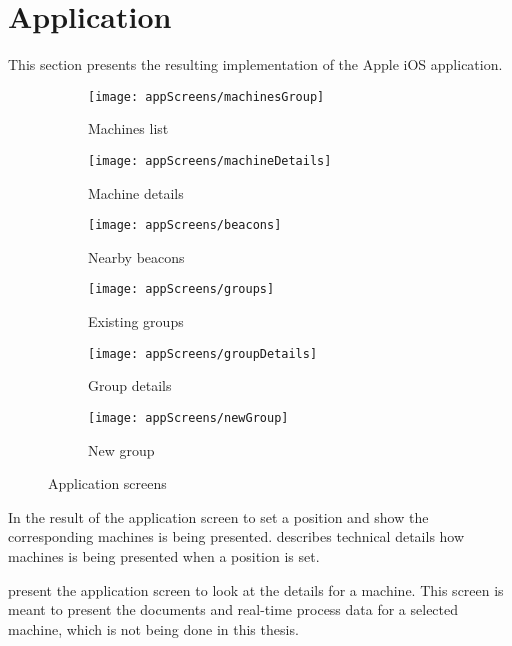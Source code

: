 \section{Application}\label{sec:resultApp}
This section presents the resulting implementation of the Apple iOS application.

\begin{figure}[H]
	\centering
	\begin{subfigure}[t]{0.3\textwidth}
		\centering	
		\texttt{[image: appScreens/machinesGroup]}
		\caption{Machines list}
		\label{subfig:machinesList}
	\end{subfigure}%
	\begin{subfigure}[t]{0.3\textwidth}
		\centering	
		\texttt{[image: appScreens/machineDetails]}
		\caption{Machine details}
		\label{subfig:machineDetails}
	\end{subfigure}
	\begin{subfigure}[t]{0.3\textwidth}
		\centering	
		\texttt{[image: appScreens/beacons]}
		\caption{Nearby beacons}
		\label{subfig:nearbyBeacons}
	\end{subfigure}
	\begin{subfigure}[t]{0.3\textwidth}
		\centering	
		\texttt{[image: appScreens/groups]}
		\caption{Existing groups}
		\label{subfig:existingGroups}
	\end{subfigure}
	\begin{subfigure}[t]{0.3\textwidth}
		\centering	
		\texttt{[image: appScreens/groupDetails]}
		\caption{Group details}
		\label{subfig:groupDetails}
	\end{subfigure}
	\begin{subfigure}[t]{0.3\textwidth}
		\centering	
		\texttt{[image: appScreens/newGroup]}
		\caption{New group}
		\label{subfig:newGroup}
	\end{subfigure}

	\caption{Application screens}
	\label{fig:appScreens}

\end{figure}

In  the result of the application screen to set a position and show the corresponding machines is being presented.
 describes technical details how machines is being presented when a position is set.

\bigskip

 present the application screen to look at the details for a machine.
This screen is meant to present the documents and real-time process data for a selected machine, which is not being done in this thesis. 

